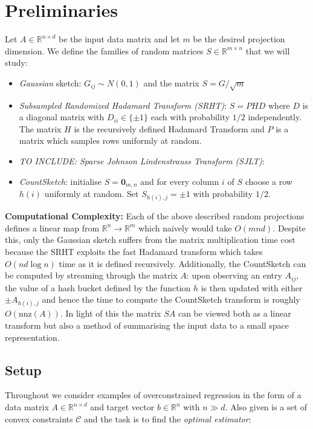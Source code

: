 \documentclass[twoside]{article}
\newcommand{\R}{\mathbb{R}}
\newcommand{\nnz}[1]{\text{nnz}(#1)}
\theoremstyle{definition}\newtheorem{thm}{Theorem}[section]
\theoremstyle{definition}\newtheorem{mydef}[thm]{Definition}
\theoremstyle{definition}\newtheorem{rem}[thm]{Remark}
\theoremstyle{definition}\newtheorem{prop}[thm]{Proposition}
\theoremstyle{definition}\newtheorem{example}[thm]{Example}
\theoremstyle{definition}\newtheorem{claim}[thm]{Claim}
\theoremstyle{definition}\newtheorem{Qu}[thm]{Question}
\theoremstyle{definition}\newtheorem{Lemma}[thm]{Lemma}
\theoremstyle{definition}\newtheorem{Cor}[thm]{Corollary}
\theoremstyle{definition}\newtheorem{Fact}[]{Fact}
\begin{document}
\section{Preliminaries} \label{sec: preliminaries}

Let $A \in \R^{n \times d}$ be the input data matrix and let $m$ be the
desired projection dimension.
We define the families of random matrices $S \in \R^{m \times n}$ that we will
study:
\begin{itemize}
  \item \textit{Gaussian} sketch: $G_{ij} \sim N(0,1)$ and the matrix
  $S = G/\sqrt{m}$
  \item \textit{Subsampled Randomized Hadamard Transform (SRHT)}: $S = PHD$
  where $D$ is a diagonal matrix with $D_{ii} \in \{ \pm 1 \}$ each with
  probability $1/2$ independently.
  The matrix $H$ is the recursively defined Hadamard Transform and $P$ is
  a matrix
  which samples rows uniformly at random.
  \item{\textit{TO INCLUDE: Sparse Johnson Lindenstrauss Transform (SJLT)}:}
  \item \textit{CountSketch}: initialise $S = \mathbf{0}_{m,n}$ and for every
  column $i$ of $S$ choose a row $h(i)$ uniformly at random.
  Set $S_{h(i),j} = \pm 1$ with probability $1/2$.
\end{itemize}

\textbf{Computational Complexity:}
Each of the above described random projections defines a linear map from $\R^n
\to \R^m$ which naively would take $O(mnd)$.
Despite this, only the Gaussian sketch suffers from the matrix multiplication
time cost because the SRHT exploits the fast Hadamard transform which takes
$O(nd \log n)$ time as it is defined recursively.
Additionally, the CountSketch can be computed by streaming through the matrix
$A$: upon observing an entry $A_{ij}$, the value of a hash bucket defined
by the function $h$ is then updated with either $\pm A_{h(i),j}$ and hence
the time
to compute the CountSketch transform is roughly $O(\nnz{A})$.
In light of this the matrix $SA$ can be viewed both as a linear transform but
also a method of summarising the input data to a small space representation.

\subsection{Setup}
Throughout we consider examples of overconstrained regression in the form of
a data matrix $A \in \R^{n \times d}$ and target vector $b \in \R^{n}$ with
$n \gg d$.
Also given is a set of convex constraints $\mathcal{C}$ and the task is to
find the \textit{optimal estimator}:
\end{document}
